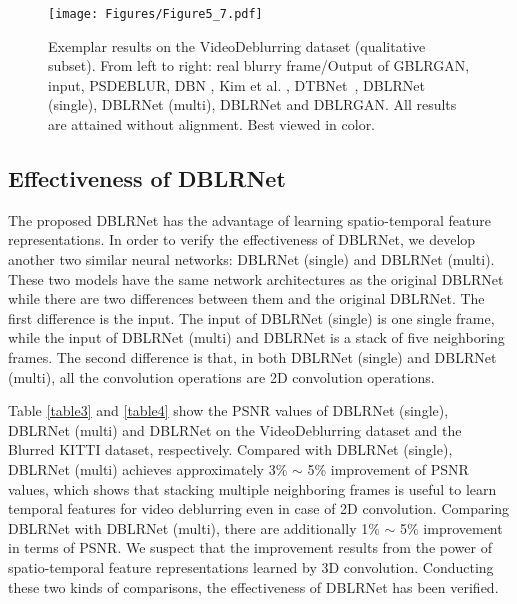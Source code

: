 \documentclass[journal]{IEEEtran}
\begin{document}
\begin{figure*}[ht]
	\centering
	\texttt{[image: Figures/Figure5\_7.pdf]}
	\caption{ Exemplar results on the VideoDeblurring dataset (qualitative subset). From left to right: real blurry frame/Output of GBLRGAN, input, PSDEBLUR, DBN \cite{su2016deep}, Kim et al. \cite{hyun2015generalized}, DTBNet~\cite{kim2017online}, DBLRNet (single), DBLRNet (multi), DBLRNet and DBLRGAN. All results are attained without alignment. Best viewed in color.}
	\label{figure5}
\end{figure*}


\subsection{Effectiveness of DBLRNet}
The proposed DBLRNet has the advantage of learning spatio-temporal feature representations. In order to verify the effectiveness of DBLRNet, we develop another two similar neural networks: DBLRNet (single) and DBLRNet (multi). These two models have the same network architectures as the original DBLRNet while there are two differences between them and the original DBLRNet. The first difference is the input. The input of DBLRNet (single) is one single frame, while the input of DBLRNet (multi) and DBLRNet is a stack of five neighboring frames. The second difference is that, in both DBLRNet (single) and DBLRNet (multi), all the convolution operations are 2D convolution operations. 

Table \ref{table3} and \ref{table4} show the PSNR values of DBLRNet (single), DBLRNet (multi) and DBLRNet on the VideoDeblurring dataset and the Blurred KITTI dataset, respectively. Compared with DBLRNet (single), DBLRNet (multi) achieves approximately 3\% $\sim$ 5\% improvement of PSNR values, which shows that stacking multiple neighboring frames is useful to learn temporal features for video deblurring even in case of 2D convolution. Comparing DBLRNet with DBLRNet (multi), there are additionally 1\% $\sim$ 5\% improvement in terms of PSNR. We suspect that the improvement results from the power of spatio-temporal feature representations learned by 3D convolution. Conducting these two kinds of comparisons, the effectiveness of DBLRNet has been verified.
\end{document}
